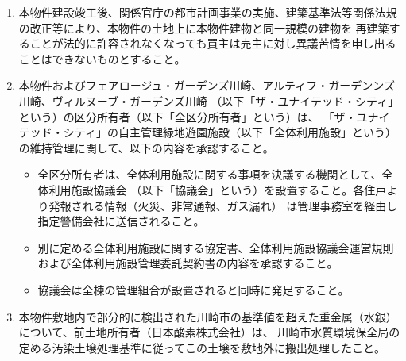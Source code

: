 \documentclass[
  luatex,
  paper=a4paper,
  fontsize=11pt,
  jafontsize=11pt,
  jlreq_notes,
]{jlreq}
\begin{document}
\begin{enumerate}
        あること（「ザ・ユナイテッド・シティ」全体概略図参照）。
  \item 本物件建設竣工後、関係官庁の都市計画事業の実施、建築基準法等関係法規の改正等により、本物件の土地上に本物件建物と同一規模の建物を
        再建築することが法的に許容されなくなっても買主は売主に対し異議苦情を申し出ることはできないものとすること。
  \item 本物件およびフェアロージュ・ガーデンズ川崎、アルティフ・ガーデンンズ川崎、ヴィルヌーブ・ガーデンズ川崎
        （以下「ザ・ユナイテッド・シティ」という）の区分所有者（以下「全区分所有者」という）は、
        「ザ・ユナイテッド・シティ」の自主管理緑地遊園施設（以下「全体利用施設」という）の維持管理に関して、以下の内容を承認すること。
          \begin{itemize}
            \item[① ] 全区分所有者は、全体利用施設に関する事項を決議する機関として、全体利用施設協議会
              （以下「協議会」という）を設置すること。各住戸より発報される情報（火災、非常通報、ガス漏れ）
              は管理事務室を経由し指定警備会社に送信されること。
            \item[② ] 別に定める全体利用施設に関する協定書、全体利用施設協議会運営規則および全体利用施設管理委託契約書の内容を承認すること。
            \item[③ ] 協議会は全棟の管理組合が設置されると同時に発足すること。
          \end{itemize}
  \item 本物件敷地内で部分的に検出された川崎市の基準値を超えた重金属（水銀）について、前土地所有者（日本酸素株式会社）は、
        川崎市水質環境保全局の定める汚染土壌処理基準に従ってこの土壌を敷地外に搬出処理したこと。
  \end{enumerate}
  
  \newpage

\end{document}
